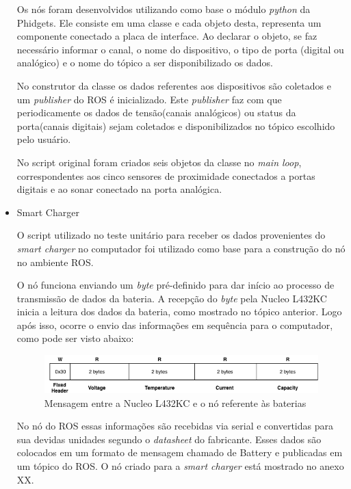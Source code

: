 \begin{itemize}
		Os nós foram desenvolvidos utilizando como base o módulo \textit{python} da Phidgets. Ele consiste em uma classe e cada objeto desta, representa um componente conectado a placa de interface. Ao declarar o objeto, se faz necessário informar o canal, o nome do dispositivo, o tipo de porta (digital ou analógico) e o nome do tópico a ser disponibilizado os dados. 
		
		No construtor da classe os dados referentes aos dispositivos são coletados e um \textit{publisher} do ROS é inicializado. Este  \textit{publisher} faz com que periodicamente os dados de tensão(canais analógicos) ou status da porta(canais digitais) sejam coletados e disponibilizados no tópico escolhido pelo usuário. 
		
		No script original foram criados seis objetos da classe no \textit{main loop}, correspondentes aos cinco sensores de proximidade conectados a portas digitais e ao sonar conectado na porta analógica.
		
		\item Smart Charger
		
		O script utilizado no teste unitário para receber os dados provenientes do \textit{smart charger} no computador foi utilizado como base para a construção do nó no ambiente ROS.
		
		O nó funciona enviando um \textit{byte} pré-definido para dar início ao processo de transmissão de dados da bateria. A recepção do \textit{byte} pela Nucleo L432KC inicia a leitura dos dados da bateria, como mostrado no tópico anterior. Logo após isso, ocorre o envio das informações em sequência para o computador, como pode ser visto abaixo:
		
		\begin{figure}[!ht]
			\centering
			\includegraphics[width=16cm]{Figures/batt_protocol_2.png}
			\caption{Mensagem entre a Nucleo L432KC e o nó referente às baterias}
			\label{fig:battprotocol2}
		\end{figure}
		
		No nó do ROS essas informações são recebidas via serial e convertidas para sua devidas unidades segundo o \textit{datasheet} do fabricante. Esses dados são colocados em um formato de mensagem chamado de Battery e publicadas em um tópico do ROS. O nó criado para a \textit{smart charger} está mostrado no anexo XX.
		

\end{itemize}
